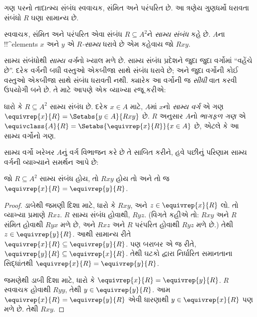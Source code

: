 \documentclass[../../../include/open-logic-section]{subfiles}
\begin{document}


ગણ પરનો તાદાત્મ્ય સંબંધ સ્વવાચક, સંમિત અને પરંપરિત છે.
આ ત્રણેય ગુણધર્મો ધરાવતા સંબંધો $R$ ઘણા સામાન્ય છે.

\begin{defn}[સામ્ય સંબંધ]
સ્વવાચક, સંમિત અને પરંપરિત એવા સંબંધ $R \subseteq A^2$ને
\emph{સામ્ય સંબંધ} કહે છે. $A$ના !!^{element}s $x$ અને $y$
એ \emph{$R$-સામ્ય} ધરાવે છે એમ કહેવાય જો $Rxy$.
\end{defn}

સામ્ય સંબંધોથી \emph{સામ્ય વર્ગ}નો ખ્યાલ મળે છે.
સામ્ય સંબંધ પ્રદેશને જુદા જુદા વર્ગોમાં “વહેંચે છે”.
દરેક વર્ગની બધી વસ્તુઓ એકબીજા સાથે સંબંધ ધરાવે છે;
અને જુદા વર્ગોની કોઈ વસ્તુઓ એકબીજા સાથે સંબંધ ધરાવતી નથી.
ક્યારેક આ વર્ગોની જ \emph{સીધી} વાત કરવી ઉપયોગી બને છે.
તે માટે આપણે એક વ્યાખ્યા રજૂ કરીએ:

\begin{defn}
ધારો કે $R \subseteq A^2$ સામ્ય સંબંધ છે. દરેક $x \in A$
માટે, $A$માં $x$નો \emph{સામ્ય વર્ગ} એ ગણ
$\equivrep{x}{R} = \Setabs{y \in A}{Rxy}$ છે.
$R$ અનુસાર $A$નો \emph{ભાગફળ ગણ} એ
$\equivclass{A}{R} = \Setabs{\equivrep{x}{R}}{x \in A}$ છે,
એટલે કે આ સામ્ય વર્ગોનો ગણ.
\end{defn}

સામ્ય વર્ગો ખરેખર $A$નું વર્ગ વિભાજન કરે છે તે સાબિત કરીને,
હવે પછીનું પરિણામ સામ્ય વર્ગની વ્યાખ્યાને સમર્થન આપે છે:

\begin{prop}
જો $R \subseteq A^2$ સામ્ય સંબંધ હોય, તો $Rxy$ હોય
તો અને તો જ $\equivrep{x}{R} = \equivrep{y}{R}$.
\end{prop}

\begin{proof}
ડાબેથી જમણી દિશા માટે, ધારો કે $Rxy$, અને
$z \in \equivrep{x}{R}$ લો. તો વ્યાખ્યા પ્રમાણે $Rxz$.
$R$ સામ્ય સંબંધ હોવાથી, $Ryz$. (વિગતે કહીએ તો:
$Rxy$ અને $R$ સંમિત હોવાથી $Ryx$ મળે છે, અને
$Rxz$ અને $R$ પરંપરિત હોવાથી $Ryz$ મળે છે.)
તેથી $z \in \equivrep{y}{R}$. આથી સામાન્ય રીતે
$\equivrep{x}{R} \subseteq \equivrep{y}{R}$.
પણ બરાબર એ જ રીતે,
$\equivrep{y}{R} \subseteq \equivrep{x}{R}$.
તેથી ઘટકો દ્વારા નિર્ધારિત સમાનતાના સિદ્ધાંતથી
$\equivrep{x}{R} = \equivrep{y}{R}$.

જમણેથી ડાબી દિશા માટે, ધારો કે
$\equivrep{x}{R} = \equivrep{y}{R}$.
$R$ સ્વવાચક હોવાથી $Ryy$, તેથી $y \in \equivrep{y}{R}$.
આમ $\equivrep{x}{R} = \equivrep{y}{R}$ એવી ધારણાથી
$y \in \equivrep{x}{R}$ પણ મળે છે. તેથી $Rxy$.
\end{proof}
\end{document}
